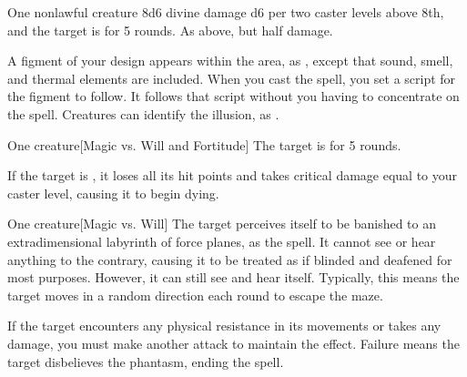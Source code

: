 \spellrng{\rngmed}
\begin{spelltarget}{One nonlawful creature}
    \spellsuccess 8d6 divine damage \add d6 per two caster levels above 8th, and the target is \bewildered for 5 rounds.
    \spellfailure As above, but half damage.
\end{spelltarget}

\spelldur{\durmed \dismissable}
\spellline
\spelleffect A figment of your design appears within the area, as , except that sound, smell, and thermal elements are included. When you cast the spell, you set a script for the figment to follow. It follows that script without you having to concentrate on the spell.
\spellnotes Creatures can identify the illusion, as .

\spellrng{\rngmed}
\begin{spelltarget}{One creature}[Magic vs. Will and Fortitude]
    \spellsuccess[Will] The target is \shaken for 5 rounds.

     If the target is \bloodied, it loses all its hit points and takes critical damage equal to your caster level, causing it to begin dying.
\end{spelltarget}

\spellrng{\rngmed}
\spelldur{\durmed}
\begin{spelltarget}{One creature}[Magic vs. Will]
    \spellsuccess The target perceives itself to be banished to an extradimensional labyrinth of force planes, as the  spell. It cannot see or hear anything to the contrary, causing it to be treated as if blinded and deafened for most purposes. However, it can still see and hear itself. Typically, this means the target moves in a random direction each round to escape the maze.

    If the target encounters any physical resistance in its movements or takes any damage, you must make another attack to maintain the effect. Failure means the target disbelieves the phantasm, ending the spell.
\end{spelltarget}

